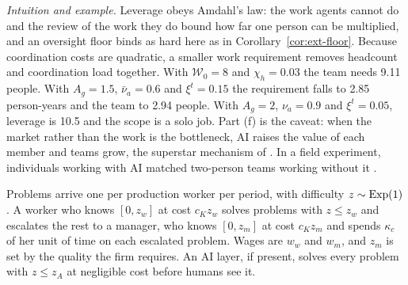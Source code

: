 \noindent\emph{Intuition and example.} Leverage obeys Amdahl's law: the work agents cannot do and the review of the work they do bound how far one person can be multiplied, and an oversight floor binds as hard here as in Corollary~\ref{cor:ext-floor}. Because coordination costs are quadratic, a smaller work requirement removes headcount and coordination load together. With $\mathcal W_0=8$ and $\chi_h=0.03$ the team needs 9.11 people. With $A_g=1.5$, $\bar\nu_a=0.6$ and $\xi^t=0.15$ the requirement falls to 2.85 person-years and the team to 2.94 people. With $A_g=2$, $\nu_a=0.9$ and $\xi^t=0.05$, leverage is 10.5 and the scope is a solo job. Part (f) is the caveat: when the market rather than the work is the bottleneck, AI raises the value of each member and teams grow, the superstar mechanism of \citet{rosen1981economics}. In a field experiment, individuals working with AI matched two-person teams working without it \citep{dellacqua2026cybernetic}.

\begin{assumption}\label{ass:ext-hierarchy}
Problems arrive one per production worker per period, with difficulty $z\sim{\rm Exp}(1)$. A worker who knows $[0,z_w]$ at cost $c_Kz_w$ solves problems with $z\le z_w$ and escalates the rest to a manager, who knows $[0,z_m]$ at cost $c_Kz_m$ and spends $\kappa_c$ of her unit of time on each escalated problem. Wages are $w_w$ and $w_m$, and $z_m$ is set by the quality the firm requires. An AI layer, if present, solves every problem with $z\le z_A$ at negligible cost before humans see it.
\end{assumption}


